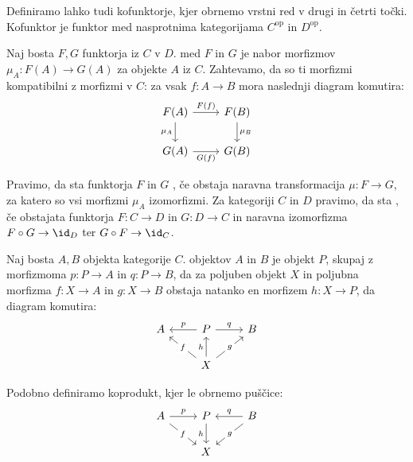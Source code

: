 Definiramo lahko tudi kofunktorje, kjer obrnemo vrstni red v drugi in četrti
točki.
Kofunktor je funktor med nasprotnima kategorijama $C^{\text{op}}$ in
$D^{\text{op}}$.

\begin{definicija}
  Naj bosta $F, G$ funktorja iz $C$ v $D$.
   med $F$ in $G$ je nabor morfizmov $\mu_A: F(A)
  \to G(A)$ za objekte $A$ iz $C$.
  Zahtevamo, da so ti morfizmi kompatibilni z morfizmi v $C$: za vsak $f: A \to
  B$ mora naslednji diagram komutira:
  \[\begin{tikzcd}
	  {F(A)} & {F(B)} \\
	  {G(A)} & {G(B)}
	  \arrow["{F(f)}", from=1-1, to=1-2]
	  \arrow["{\mu_A}"', from=1-1, to=2-1]
	  \arrow["{\mu_B}", from=1-2, to=2-2]
	  \arrow["{G(f)}"', from=2-1, to=2-2]
	\end{tikzcd}\]
\end{definicija}

Pravimo, da sta funktorja $F$ in $G$ , če obstaja
naravna transformacija $\mu: F \to G$, za katero so vsi morfizmi $\mu_A$
izomorfizmi.
Za kategoriji $C$ in $D$ pravimo, da sta , če obstajata
funktorja $F: C \to D$ in $G: D \to C$ in naravna izomorfizma $F \circ G \to
\id_D$ ter $G \circ F \to \id_C$.

\begin{definicija}
  Naj bosta $A,B$ objekta kategorije $C$.
   objektov $A$ in $B$ je objekt $P$, skupaj z morfizmoma $p: P
  \to A$ in $q: P \to B$, da za poljuben objekt $X$ in poljubna morfizma $f: X
  \to A$ in $g: X \to B$ obstaja natanko en morfizem $h: X \to P$, da diagram
  komutira:
  \[\begin{tikzcd}
	  A & P & B \\
	  & X
	  \arrow["p"', from=1-2, to=1-1]
	  \arrow["q", from=1-2, to=1-3]
	  \arrow["f"{description}, from=2-2, to=1-1]
	  \arrow["h", from=2-2, to=1-2]
	  \arrow["g"{description}, from=2-2, to=1-3]
	\end{tikzcd}\]
\end{definicija}

Podobno definiramo koprodukt, kjer le obrnemo puščice:
\[\begin{tikzcd}
	A & P & B \\
	& X
	\arrow["p", from=1-1, to=1-2]
	\arrow["f"{description}, from=1-1, to=2-2]
	\arrow["h"', from=1-2, to=2-2]
	\arrow["q"', from=1-3, to=1-2]
	\arrow["g"{description}, from=1-3, to=2-2]
  \end{tikzcd}\]

